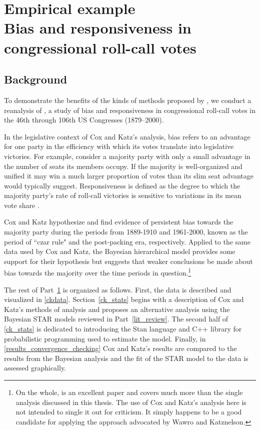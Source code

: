 \chapter[Empirical example: Bias and Responsiveness in Congressional Roll-Call Votes]{Empirical example \\[-20pt]\large Bias and responsiveness in congressional roll-call votes}
\label{cox_katz}

\vspace{-1cm}
\section{Background}
\label{ck_background}

To demonstrate the benefits of the kinds of methods proposed by , 
we conduct a reanalysis of , a study of bias and responsiveness 
in congressional roll-call votes in the 46th through 106th US Congresses (1879--2000). 

In the legislative context of Cox and Katz's analysis, bias refers to an advantage for one party 
in the efficiency with which its votes translate into legislative victories. For example, consider 
a majority party with only a small advantage in the number of seats its members occupy. If the 
majority is well-organized and unified it may win a much larger proportion of votes than its slim 
seat advantage would typically suggest. Responsiveness is defined as the degree to which the 
majority party's rate of roll-call victories is sensitive to variations in its mean vote share 
. 

Cox and Katz hypothesize and find evidence of persistent bias towards the majority party during 
the periods from 1889-1910 and 1961-2000, known as the period of ``czar rule" and the post-packing 
era, respectively. Applied to the same data used by Cox and Katz, the Bayesian hierarchical 
model provides some support for their hypothesis but suggests that weaker conclusions 
be made about bias towards the majority over the time periods in question.\footnote{On the whole, 
 is an excellent paper and covers 
much more than the single analysis discussed in this thesis. The use of Cox and Katz's analysis here
is not intended to single it out for criticism. It simply happens to be a good candidate for applying the 
approach advocated by Wawro and Katznelson.} 

The rest of Part~\ref{cox_katz} is organized as follows. First, the data is described and visualized 
in \ref{ckdata}. Section~\ref{ck_stats} begins with a description of Cox and Katz's methods of analysis 
and proposes an alternative analysis using the Bayesian STAR models reviewed in Part~\ref{lit_review}. 
The second half of \ref{ck_stats} is dedicated to introducing the Stan language and C++ library for 
probabilistic programming used to estimate the model. Finally, in \ref{results_convergence_checking}  
Cox and Katz's results are compared to the results from the Bayesian analysis and the fit of the STAR model
to the data is assessed graphically.  
